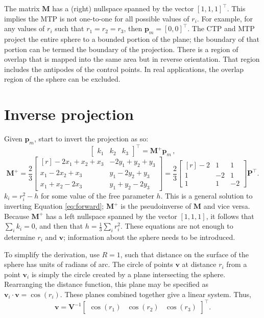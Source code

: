 \documentclass[]{interact}
\begin{document}
The matrix $\mathbf M$ has a (right) nullspace spanned by the vector
$[1, 1, 1]^\top$. This implies the MTP is not one-to-one for all possible values
of $r_i$. For example, for any values of $r_i$ such that $r_1 = r_2 = r_3$, then
$\mathbf p_m = [0, 0]^\top$. The CTP and MTP project the entire sphere to a
bounded portion of the plane; the boundary of that portion can be termed the
boundary of the projection. There is a region of overlap that is mapped into
the same area but in reverse orientation.
That region includes the antipodes of the control points.
In real applications, the overlap region of the sphere can be excluded.

\section{Inverse projection}
Given $\mathbf p_m$, start to invert the projection as so:
\begin{equation}\label{eq:inverse}
\begin{bmatrix*} k_1 & k_2 & k_3
\end{bmatrix*}^\top = \mathbf M^+ \mathbf p_m \,,
\end{equation}
\begin{equation}\label{eq:inversem}
\mathbf M^+ = \frac{2}{3}
\begin{bmatrix*}[r] -2x_1 + x_2 + x_3 & -2y_1 + y_2 + y_3 \\
x_1 - 2x_2 + x_3 & y_1 - 2y_2 + y_3 \\
x_1 + x_2 - 2x_3 & y_1 + y_2 - 2y_3
\end{bmatrix*} = \frac{2}{3}
\begin{bmatrix*}[r] -2 & 1 & 1 \\
1 & -2 & 1 \\
1 & 1 & -2
\end{bmatrix*}
\mathbf P^\top .
\end{equation}
$k_i = r^2_i - h$ for some value of the free parameter $h$. This is a general
solution to inverting Equation \ref{eq:forward}; $\mathbf M^+$ is the
pseudoinverse of $\mathbf M$ and vice versa. Because $\mathbf M^+$ has a left
nullspace spanned by the vector $[1, 1, 1]$, it follows that $\sum_i k_i = 0$,
and then that $h = \frac{1}{3}\sum_i r^2_i$.
These equations are not enough to determine $r_i$ and $\mathbf v$;
information about the sphere needs to be introduced.

To simplify the derivation, use $R=1$, such that distance on the surface of the
sphere has units of radians of arc. The circle of points $\mathbf v$ at
distance $r_i$ from a point $\mathbf v_i$ is simply the circle created by a
plane intersecting the sphere. Rearranging the distance function, this plane
may be specified as $\mathbf v_i \cdot \mathbf v = \cos\left(r_i\right).$
These planes combined together give a linear system. Thus,
\begin{equation}\label{eq:inversev}
  \mathbf v = \mathbf V^{-1} \begin{bmatrix*} \cos\left(r_1\right) &
  \cos\left(r_2\right) &
  \cos\left(r_3\right)
  \end{bmatrix*}^\top .
\end{equation}
\end{document}
